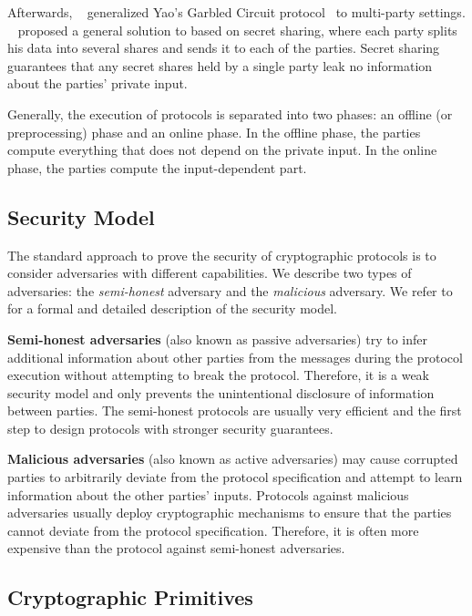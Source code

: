 Afterwards, \bmr~\cite{beaver1990round} generalized Yao's Garbled Circuit protocol~\cite{yao1986generate} to multi-party settings. \gmw~\cite{goldreich1987play} proposed a general solution to \smpc based on secret sharing, where each party splits his data into several shares and sends it to each of the parties.
Secret sharing guarantees that any secret shares held by a single party leak no information about the parties' private input.

Generally, the execution of \smpc protocols is separated into two phases: an offline (or preprocessing) phase and an online phase.
In the offline phase, the parties compute everything that does not depend on the private input. In the online phase, the parties compute the input-dependent part.


\subsection{Security Model}
\label{subsec:SecurityModel}
The standard approach to prove the security of cryptographic protocols is to consider adversaries with different capabilities.
We describe two types of adversaries: the \textit{semi-honest} adversary and the \textit{malicious} adversary. We refer to~\cite[Chapter~2]{evans2017pragmatic} for a formal and detailed description of the security model.

\textbf{Semi-honest adversaries} (also known as passive adversaries) try to infer additional information about other parties from the messages during the protocol execution without attempting to break the protocol. Therefore, it is a weak security model and only prevents the unintentional disclosure of information between parties. The semi-honest protocols are usually very efficient and the first step to design protocols with stronger security guarantees.

\textbf{Malicious adversaries} (also known as active adversaries) may cause corrupted parties to arbitrarily deviate from the protocol specification and attempt to learn information about the other parties' inputs. Protocols against malicious adversaries usually deploy cryptographic mechanisms to ensure that the parties cannot deviate from the protocol specification. Therefore, it is often more expensive than the protocol against semi-honest adversaries.

\subsection{Cryptographic Primitives}
\label{subsec:CryptographicPrimitivesforSecureMulti-PartyComputation}

